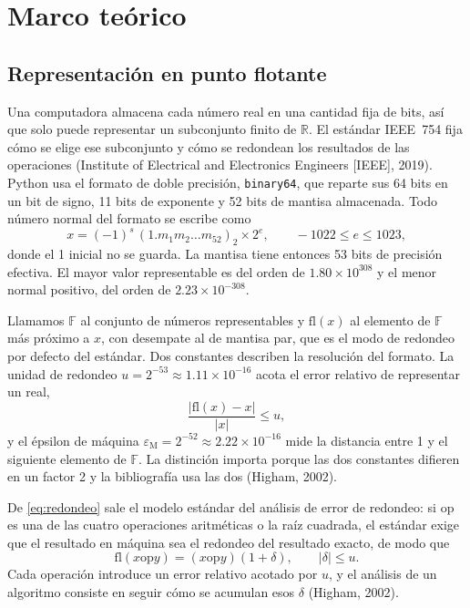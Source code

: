 \section{Marco teórico}
\label{sec:marco}

\subsection{Representación en punto flotante}
\label{subsec:punto-flotante}

Una computadora almacena cada número real en una cantidad fija de bits, así que solo puede
representar un subconjunto finito de $\mathbb{R}$. El estándar IEEE~754 fija cómo se elige ese
subconjunto y cómo se redondean los resultados de las operaciones (Institute of Electrical and
Electronics Engineers [IEEE], 2019). Python usa el
formato de doble precisión, \texttt{binary64}, que reparte sus 64 bits en un bit de signo, 11 bits
de exponente y 52 bits de mantisa almacenada. Todo número normal del formato se escribe como
\begin{equation}
  x = (-1)^{s}\,(1.m_1m_2\ldots m_{52})_2 \times 2^{e},
  \qquad -1022 \le e \le 1023 ,
  \label{eq:binary64}
\end{equation}
donde el 1 inicial no se guarda. La mantisa tiene entonces 53 bits de precisión efectiva. El mayor
valor representable es del orden de $1.80 \times 10^{308}$ y el menor normal positivo, del orden de
$2.23 \times 10^{-308}$.

Llamamos $\mathbb{F}$ al conjunto de números representables y $\mathrm{fl}(x)$ al elemento de
$\mathbb{F}$ más próximo a $x$, con desempate al de mantisa par, que es el modo de redondeo por
defecto del estándar. Dos constantes describen la resolución del formato. La unidad de redondeo
$u = 2^{-53} \approx 1.11 \times 10^{-16}$ acota el error relativo de representar un real,
\begin{equation}
  \frac{|\mathrm{fl}(x) - x|}{|x|} \le u ,
  \label{eq:redondeo}
\end{equation}
y el épsilon de máquina $\varepsilon_{\mathrm{M}} = 2^{-52} \approx 2.22 \times 10^{-16}$ mide la
distancia entre 1 y el siguiente elemento de $\mathbb{F}$. La distinción importa porque las dos
constantes difieren en un factor 2 y la bibliografía usa las dos (Higham, 2002).

De \eqref{eq:redondeo} sale el modelo estándar del análisis de error de redondeo: si
$\mathrm{op}$ es una de las cuatro operaciones aritméticas o la raíz cuadrada, el estándar exige que
el resultado en máquina sea el redondeo del resultado exacto, de modo que
\begin{equation}
  \mathrm{fl}(x \mathbin{\mathrm{op}} y) = (x \mathbin{\mathrm{op}} y)(1 + \delta),
  \qquad |\delta| \le u .
  \label{eq:modelo}
\end{equation}
Cada operación introduce un error relativo acotado por $u$, y el análisis de un algoritmo consiste
en seguir cómo se acumulan esos $\delta$ (Higham, 2002).

